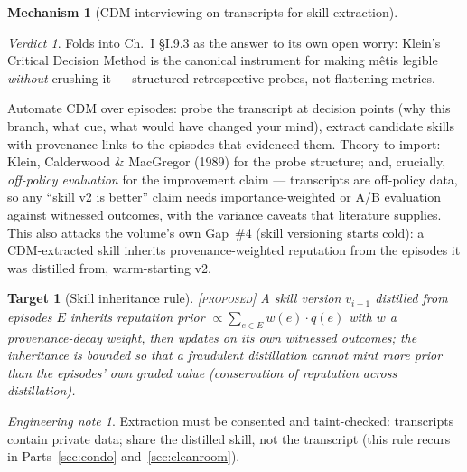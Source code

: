 \documentclass[11pt,a4paper]{article}
\newtheorem{target}{Target}[section]
\theoremstyle{definition}
\newtheorem{mech}{Mechanism}
\theoremstyle{remark}
\newtheorem*{verdict}{Verdict}
\newtheorem*{note}{Engineering note}
\newcommand{\grade}[1]{\textsc{[#1]}}
\begin{document}
\begin{mech}[CDM interviewing on transcripts for skill extraction]
\begin{verdict} Folds into Ch.~I \S I.9.3 as the answer to its own open worry: Klein's Critical Decision Method is the canonical instrument for making m\^etis legible \emph{without} crushing it --- structured retrospective probes, not flattening metrics. \end{verdict}
Automate CDM over episodes: probe the transcript at decision points (why this branch, what cue, what would have changed your mind), extract candidate skills with provenance links to the episodes that evidenced them. Theory to import: Klein, Calderwood \& MacGregor (1989) for the probe structure; and, crucially, \emph{off-policy evaluation} for the improvement claim --- transcripts are off-policy data, so any ``skill v2 is better'' claim needs importance-weighted or A/B evaluation against witnessed outcomes, with the variance caveats that literature supplies. This also attacks the volume's own Gap~\#4 (skill versioning starts cold): a CDM-extracted skill inherits provenance-weighted reputation from the episodes it was distilled from, warm-starting v2.
\begin{target}[Skill inheritance rule]\grade{proposed} A skill version $v_{i+1}$ distilled from episodes $E$ inherits reputation prior $\propto \sum_{e \in E} w(e) \cdot q(e)$ with $w$ a provenance-decay weight, then updates on its own witnessed outcomes; the inheritance is bounded so that a fraudulent distillation cannot mint more prior than the episodes' own graded value (conservation of reputation across distillation). \end{target}
\begin{note} Extraction must be consented and taint-checked: transcripts contain private data; share the distilled skill, not the transcript (this rule recurs in Parts~\ref{sec:condo} and~\ref{sec:cleanroom}). \end{note}
\end{mech}
\end{document}
